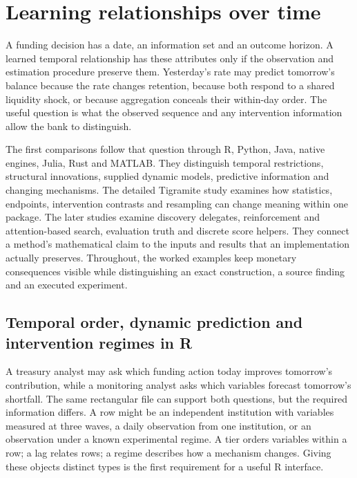 \chapter{Learning relationships over time}

A funding decision has a date, an information set and an outcome horizon.
A learned temporal relationship has these attributes only if the observation
and estimation procedure preserve them. Yesterday's rate may predict tomorrow's
balance because the rate changes retention, because both respond to a shared
liquidity shock, or because aggregation conceals their within-day order. The
useful question is what the observed sequence and any intervention information
allow the bank to distinguish.

The first comparisons follow that question through R, Python, Java, native
engines, Julia, Rust and MATLAB. They distinguish temporal restrictions,
structural innovations, supplied dynamic models, predictive information and
changing mechanisms. The detailed Tigramite study examines how statistics,
endpoints, intervention contrasts and resampling can change meaning within
one package. The later studies examine discovery delegates, reinforcement and
attention-based search, evaluation truth and discrete score helpers. They
connect a method's mathematical claim to the inputs and results that an
implementation actually preserves. Throughout, the worked examples keep
monetary consequences visible while distinguishing an exact construction,
a source finding and an executed experiment.





\section{Temporal order, dynamic prediction and intervention regimes in R}
\label{exec14:r-temporal}

A treasury analyst may ask which funding action today improves tomorrow's
contribution, while a monitoring analyst asks which variables forecast tomorrow's
shortfall. The same rectangular file can support both questions, but the required
information differs. A row might be an independent institution with variables
measured at three waves, a daily observation from one institution, or an
observation under a known experimental regime. A tier orders variables within a
row; a lag relates rows; a regime describes how a mechanism changes. Giving these
objects distinct types is the first requirement for a useful R interface.

